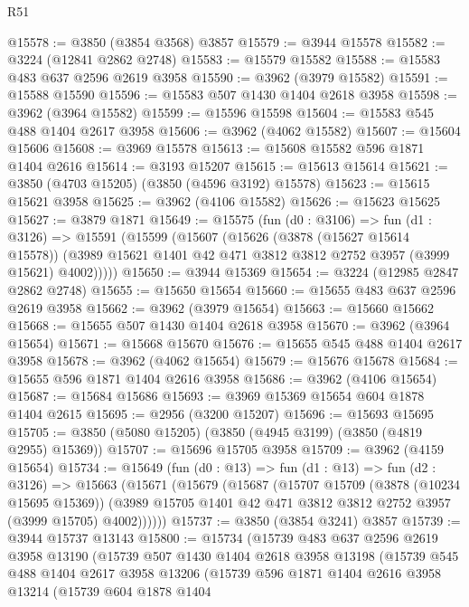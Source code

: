 \begin{lexlean}{R51}
\begin{coremodule}
@15578 := @3850 (@3854 @3568) @3857
@15579 := @3944 @15578
@15582 := @3224 (@12841 @2862 @2748)
@15583 := @15579 @15582
@15588 := @15583 @483 @637 @2596 @2619 @3958
@15590 := @3962 (@3979 @15582)
@15591 := @15588 @15590
@15596 := @15583 @507 @1430 @1404 @2618 @3958
@15598 := @3962 (@3964 @15582)
@15599 := @15596 @15598
@15604 := @15583 @545 @488 @1404 @2617 @3958
@15606 := @3962 (@4062 @15582)
@15607 := @15604 @15606
@15608 := @3969 @15578
@15613 := @15608 @15582 @596 @1871 @1404 @2616
@15614 := @3193 @15207
@15615 := @15613 @15614
@15621 := @3850 (@4703 @15205) (@3850 (@4596 @3192) @15578)
@15623 := @15615 @15621 @3958
@15625 := @3962 (@4106 @15582)
@15626 := @15623 @15625
@15627 := @3879 @1871
@15649 := @15575
    (fun (d0 : @3106) =>
    fun (d1 : @3126) =>
    @15591
      (@15599
        (@15607
          (@15626
            (@3878 (@15627 @15614 @15578))
            (@3989 @15621 @1401 @42 @471 @3812 @3812 @2752 @3957 (@3999 @15621) @4002)))))
@15650 := @3944 @15369
@15654 := @3224 (@12985 @2847 @2862 @2748)
@15655 := @15650 @15654
@15660 := @15655 @483 @637 @2596 @2619 @3958
@15662 := @3962 (@3979 @15654)
@15663 := @15660 @15662
@15668 := @15655 @507 @1430 @1404 @2618 @3958
@15670 := @3962 (@3964 @15654)
@15671 := @15668 @15670
@15676 := @15655 @545 @488 @1404 @2617 @3958
@15678 := @3962 (@4062 @15654)
@15679 := @15676 @15678
@15684 := @15655 @596 @1871 @1404 @2616 @3958
@15686 := @3962 (@4106 @15654)
@15687 := @15684 @15686
@15693 := @3969 @15369 @15654 @604 @1878 @1404 @2615
@15695 := @2956 (@3200 @15207)
@15696 := @15693 @15695
@15705 := @3850 (@5080 @15205) (@3850 (@4945 @3199) (@3850 (@4819 @2955) @15369))
@15707 := @15696 @15705 @3958
@15709 := @3962 (@4159 @15654)
@15734 := @15649
    (fun (d0 : @13) =>
    fun (d1 : @13) =>
    fun (d2 : @3126) =>
    @15663
      (@15671
        (@15679
          (@15687
            (@15707
              @15709
              (@3878 (@10234 @15695 @15369))
              (@3989 @15705 @1401 @42 @471 @3812 @3812 @2752 @3957 (@3999 @15705) @4002))))))
@15737 := @3850 (@3854 @3241) @3857
@15739 := @3944 @15737 @13143
@15800 := @15734
    (@15739
      @483
      @637
      @2596
      @2619
      @3958
      @13190
      (@15739
        @507
        @1430
        @1404
        @2618
        @3958
        @13198
        (@15739
          @545
          @488
          @1404
          @2617
          @3958
          @13206
          (@15739
            @596
            @1871
            @1404
            @2616
            @3958
            @13214
            (@15739
              @604
              @1878
              @1404

\end{coremodule}
\end{lexlean}
